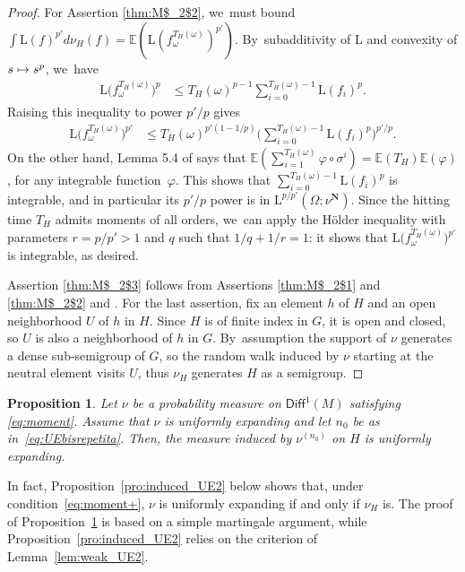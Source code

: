 \documentclass[JEP,XML,SOM,Unicode,published]{cedram}
\newcommand\mto{\mathchoice{\longmapsto}{\mapsto}{\mapsto}{\mapsto}}
\newcommand{\blrpar}[1]{\bigl(#1\bigr)}
\newcommand{\bblrpar}[1]{\biggl(#1\biggr)}
\newcommand{\ee}{\mathbb{E}}
\def\N{\mathbf{N}}
\newcommand\Diff{{\mathsf{Diff}}}
\theoremstyle{plain}
\newtheorem{pro}[thm]{Proposition}
\theoremstyle{definition}
\begin{document}
\begin{proof}
For Assertion \eqref{thm:M$_2$2}, we~must bound
$\int \mathrm L(f)^{p'} d\nu_H(f)= \ee ( \mathrm L(f_\omega^{T_H(\omega)})^{p'} )$. By~subadditivity of $\mathrm L$ and convexity of $s\mto s^{p}$, we~have
\begin{align*} \label{eq:int_T}
\mathrm L\blrpar{f_\omega^{T_H(\omega)}}^{p}
& \leq T_H(\omega)^{p-1} \sum_{i=0}^{T_H(\omega)-1} {\mathrm L(f_i)}^{p}.
\end{align*}
Raising this inequality to power $p'/p$ gives
\begin{align*}
\mathrm L\blrpar{f_\omega^{T_H(\omega)}}^{p'} & \leq T_H(\omega)^{p'(1-1/p)}
\bblrpar{\sum_{i=0}^{T_H(\omega)-1} {\mathrm L(f_i)}^{p}}^{p'/p}.
\end{align*}
On the other hand, Lemma 5.4 of \cite{benoist-quint_book} says that $\ee(\sum_{i=1}^{T_H(\omega)}\varphi \circ\sigma^i ) = \ee(T_H)\ee(\varphi)$, for any integrable function~$\varphi$. This shows that $\sum_{i=0}^{T_H(\omega)-1} {\mathrm L(f_i)}^{p}$ is integrable, and in particular its $p'/p$ power
is in $\mathrm L^{p/p'}(\Omega; \nu^\N)$. Since the hitting time $T_H$ admits moments of all orders, we~can apply the Hölder
inequality with parameters $r=p/p'>1$ and $q$ such that $1/q+1/r=1$: it shows that $\mathrm L\blrpar{f_\omega^{T_H(\omega)}}^{p'} $ is integrable, as desired.

Assertion \eqref{thm:M$_2$3} follows from Assertions \eqref{thm:M$_2$1} and \eqref{thm:M$_2$2} and \cite[Cor.\,5.6]{benoist-quint_book}.
For the last assertion, fix an element $h$ of $H$ and an open neighborhood $U$ of $h$ in $H$.
Since $H$ is of finite index in $G$, it is open and closed, so $U$ is also a neighborhood of $h$ in $G$. By~assumption the support of $\nu$ generates a dense sub-semigroup of
$G$, so the random walk induced by $\nu$ starting at the neutral element visits $U$,
thus $\nu_H$ generates $H$ as a semigroup. \end{proof}


\begin{pro}\label{pro:induced_UE}
Let $\nu$ be a probability measure on $\Diff^1(M)$ satisfying \eqref{eq:moment}. Assume that $\nu$ is uniformly expanding and
let $n_0$ be as in~\eqref{eq:UEbisrepetita}. Then, the measure induced by
$\nu^{(n_0)}$ on $H$ is uniformly expanding.
\end{pro}

In fact,
Proposition~\ref{pro:induced_UE2} below shows that, under condition~\eqref{eq:moment+}, $\nu$ is uniformly expanding if
and only if $\nu_H$ is. The proof of Proposition~\ref{pro:induced_UE} is based on a simple martingale argument, while
Proposition~\ref{pro:induced_UE2} relies on the criterion of Lemma~\ref{lem:weak_UE2}.
\end{document}
